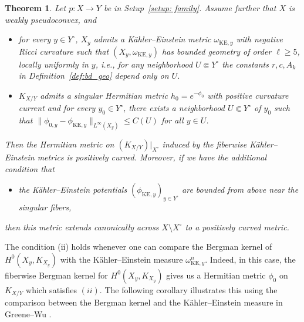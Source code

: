 \documentclass[a4paper, 11pt]{amsart}
\theoremstyle{plain}
\newtheorem{theorem}{Theorem}[section]
\numberwithin{equation}{section} %
\numberwithin{figure}{section} %
\theoremstyle{plain}
\theoremstyle{plain}
\theoremstyle{plain}
\theoremstyle{plain}
\theoremstyle{remark}
\theoremstyle{definition}
\theoremstyle{definition}
\begin{document}
\begin{theorem}\label{thm: variation-psh} Let $p:X\to Y$ be in Setup~\ref{setup: family}.  Assume further that $X$ is weakly pseudoconvex, and 
\begin{itemize}
    \item[(i)] for every $y\in Y^\circ$, $X_y$ admits a K\"ahler--Einstein metric $\omega_{\mathrm{KE},y}$ with negative Ricci curvature such that $(X_y,\omega_{\mathrm{KE},y})$ has bounded geometry of order $\ell\ge 5$, locally uniformly in $y$, i.e., for any neighborhood $U\Subset Y^\circ$ the constants $r,c,A_k$ in Definition~\ref{def:bd_geo} depend only on $U$. 
    
    \item[(ii)]  $K_{X/Y}$ admits a singular Hermitian metric $h_{0}=e^{-\phi_{0}}$ with positive curvature current and for every $y_0\in Y^\circ$, there exists a neighborhood $U\Subset Y^\circ$ of $y_0$ such that $\|\phi_{0,y}-\phi_{\mathrm{KE},y}\|_{L^\infty(X_y)}\le C(U)$ for all $y\in U$. 
\end{itemize}
Then the Hermitian metric on $(K_{X/Y})|_{X^\circ}$ induced by the fiberwise K\"ahler--Einstein metrics is positively curved.  Moreover, if we have the additional condition that
\begin{itemize}
\item[(iii)] the K\"ahler--Einstein potentials $(\phi_{\mathrm{KE},y})_{y\in Y^\circ}$ are bounded from above near the singular fibers,
\end{itemize}
then this metric extends canonically across $X\setminus X^\circ$ to a positively curved metric.
\end{theorem}
The condition (ii) holds whenever one can compare the Bergman kernel of $H^0(X_y,K_{X_y})$ with the K\"ahler--Einstein measure $\omega_{\mathrm{KE},y}^n$. Indeed, in this case, the fiberwise Bergman kernel for $H^0(X_y, K_{X_y})$ gives us a Hermitian metric $\phi_0$ on $K_{X/Y}$ which satisfies $(ii)$.  The following corollary illustrates this using the comparison between the Bergman kernel and the K\"ahler--Einstein measure in Greene--Wu \cite{Greene_Wu}. 
\end{document}
